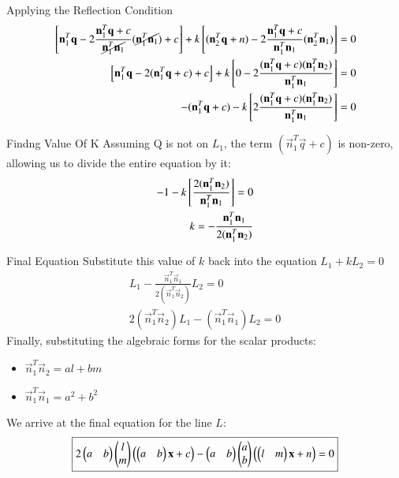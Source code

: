 \documentclass{beamer}
\begin{document}
     \begin{frame}{Applying the Reflection Condition}
     \begin{align}
    {}\left[ \mathbf{n}_1^T\mathbf{q} - 2 \frac{\mathbf{n}_1^T \mathbf{q} + c}{\cancel{\mathbf{n}_1^T \mathbf{n}_1}} (\cancel{\mathbf{n}_1^T\mathbf{n}_1}) + c \right] + k {}\left[ (\mathbf{n}_2^T \mathbf{q} + n) - 2 \frac{\mathbf{n}_1^T \mathbf{q} + c}{\mathbf{n}_1^T \mathbf{n}_1} (\mathbf{n}_2^T\mathbf{n}_1) \right] = 0\\
     {}\left[ \mathbf{n}_1^T\mathbf{q} - 2(\mathbf{n}_1^T \mathbf{q} + c) + c \right] + k {}\left[ 0 - 2 \frac{(\mathbf{n}_1^T \mathbf{q} + c)(\mathbf{n}_1^T\mathbf{n}_2)}{\mathbf{n}_1^T \mathbf{n}_1} \right] = 0  \\
    -(\mathbf{n}_1^T \mathbf{q} + c) - k {}\left[ 2 \frac{(\mathbf{n}_1^T \mathbf{q} + c)(\mathbf{n}_1^T \mathbf{n}_2)}{\mathbf{n}_1^T \mathbf{n}_1} \right] = 0
\end{align}
\end{frame}
\begin{frame}{Findng Value Of K}
    Assuming Q is not on $L_1$, the term $(\vec{n}_1^T \vec{q} + c)$ is non-zero, allowing us to divide the entire equation by it:
\begin{align}
-1 - k {}\left[ \frac{2(\mathbf{n}_1^T \mathbf{n}_2)}{\mathbf{n}_1^T \mathbf{n}_1} \right] = 0\\
k = - \frac{\mathbf{n}_1^T \mathbf{n}_1}{2(\mathbf{n}_1^T \mathbf{n}_2)}
\end{align}
\end{frame}
\begin{frame}{Final Equation}
    Substitute this value of $k$ back into the equation $L_1 + k L_2 = 0$
\begin{align}
L_1 - \frac{\vec{n}_1^T \vec{n}_1}{2(\vec{n}_1^T \vec{n}_2)} L_2 = 0\\
2(\vec{n}_1^T \vec{n}_2) L_1 - (\vec{n}_1^T \vec{n}_1) L_2 = 0
\end{align}
Finally, substituting the algebraic forms for the scalar products:
\begin{itemize}
    \item $\vec{n}_1^T \vec{n}_2 = al + bm$
    \item $\vec{n}_1^T \vec{n}_1 = a^2 + b^2$
\end{itemize}
We arrive at the final equation for the line $L$:
\begin{align}
\boxed{2\begin{pmatrix}a&b\end{pmatrix}\begin{pmatrix}l\\m\end{pmatrix}\left(\begin{pmatrix}a&b\end{pmatrix}\mathbf{x}+c\right) - \begin{pmatrix}a&b\end{pmatrix}\begin{pmatrix}a\\b\end{pmatrix}\left(\begin{pmatrix}l&m\end{pmatrix}\mathbf{x}+n\right) = 0}
\end{align}
\end{frame}
\end{document}
